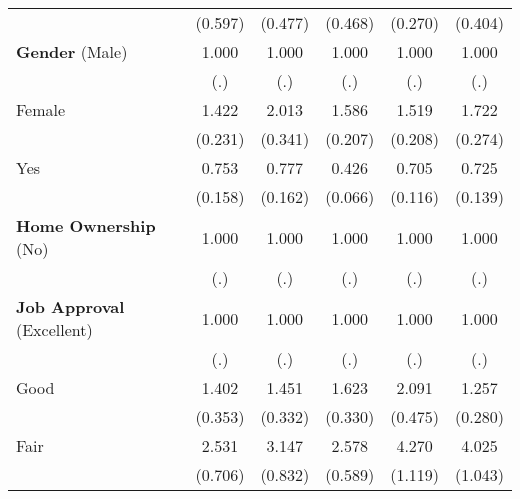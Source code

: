 \begin{table}[htbp]
\begin{tabular}{l*{5}{c}}
                    &     (0.597)         &     (0.477)         &     (0.468)         &     (0.270)         &     (0.404)         \\
\textbf{Gender} (Male)&       1.000         &       1.000         &       1.000         &       1.000         &       1.000         \\
                    &         (.)         &         (.)         &         (.)         &         (.)         &         (.)         \\
Female              &       1.422\sym{**} &       2.013\sym{***}&       1.586\sym{***}&       1.519\sym{***}&       1.722\sym{***}\\
                    &     (0.231)         &     (0.341)         &     (0.207)         &     (0.208)         &     (0.274)         \\
Yes                 &       0.753         &       0.777         &       0.426\sym{***}&       0.705\sym{**} &       0.725\sym{*}  \\
                    &     (0.158)         &     (0.162)         &     (0.066)         &     (0.116)         &     (0.139)         \\
\textbf{Home Ownership} (No)&       1.000         &       1.000         &       1.000         &       1.000         &       1.000         \\
                    &         (.)         &         (.)         &         (.)         &         (.)         &         (.)         \\
\textbf{Job Approval} (Excellent)&       1.000         &       1.000         &       1.000         &       1.000         &       1.000         \\
                    &         (.)         &         (.)         &         (.)         &         (.)         &         (.)         \\
Good                &       1.402         &       1.451         &       1.623\sym{**} &       2.091\sym{***}&       1.257         \\
                    &     (0.353)         &     (0.332)         &     (0.330)         &     (0.475)         &     (0.280)         \\
Fair                &       2.531\sym{***}&       3.147\sym{***}&       2.578\sym{***}&       4.270\sym{***}&       4.025\sym{***}\\
                    &     (0.706)         &     (0.832)         &     (0.589)         &     (1.119)         &     (1.043)         \\

\end{tabular}
\end{table}
